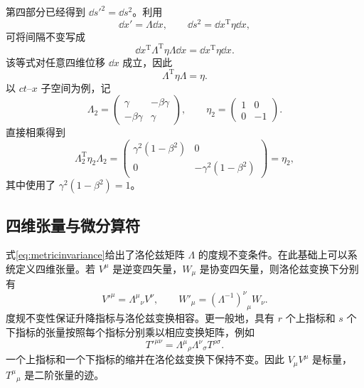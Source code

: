 \documentclass[style=classic,color=full]{lc-article}
\begin{document}
第四部分已经得到 $\dd s'^2=\dd s^2$。利用
\begin{equation}
  \dd x'=\Lambda\dd x,
  \qquad
  \dd s^2=\dd x^{\mathrm T}\eta\dd x,
\end{equation}
可将间隔不变写成
\begin{equation}
  \dd x^{\mathrm T}\Lambda^{\mathrm T}\eta\Lambda\dd x
  =\dd x^{\mathrm T}\eta\dd x.
\end{equation}
该等式对任意四维位移 $\dd x$ 成立，因此
\begin{equation}
  \boxed{\Lambda^{\mathrm T}\eta\Lambda=\eta.}
  \label{eq:metricinvariance}
\end{equation}
以 $ct$--$x$ 子空间为例，记
\begin{equation}
  \Lambda_2=
  \begin{pmatrix}\gamma&-\beta\gamma\\-\beta\gamma&\gamma\end{pmatrix},
  \qquad
  \eta_2=\begin{pmatrix}1&0\\0&-1\end{pmatrix}.
\end{equation}
直接相乘得到
\begin{equation}
  \Lambda_2^{\mathrm T}\eta_2\Lambda_2
  =\begin{pmatrix}
  \gamma^2(1-\beta^2)&0\\0&-\gamma^2(1-\beta^2)
  \end{pmatrix}
  =\eta_2,
\end{equation}
其中使用了 $\gamma^2(1-\beta^2)=1$。

\subsection{四维张量与微分算符}

式\eqref{eq:metricinvariance}给出了洛伦兹矩阵 $\Lambda$ 的度规不变条件。在此基础上可以系统定义四维张量。若 $V^\mu$ 是逆变四矢量，$W_\mu$ 是协变四矢量，则洛伦兹变换下分别有
\begin{equation}
  V'^\mu={\Lambda^\mu}_{\nu}V^\nu,
  \qquad
  W'_\mu={(\Lambda^{-1})^\nu}_{\mu}W_\nu.
  \label{eq:covariantcontravarianttransform}
\end{equation}
度规不变性保证升降指标与洛伦兹变换相容。更一般地，具有 $r$ 个上指标和 $s$ 个下指标的张量按照每个指标分别乘以相应变换矩阵，例如
\begin{equation}
  T'^{\mu\nu}
  ={\Lambda^\mu}_{\rho}{\Lambda^\nu}_{\sigma}
  T^{\rho\sigma}.
  \label{eq:ranktwotensortransform}
\end{equation}
一个上指标和一个下指标的缩并在洛伦兹变换下保持不变。因此 $V_\mu V^\mu$ 是标量，${T^\mu}_{\mu}$ 是二阶张量的迹。
\end{document}
